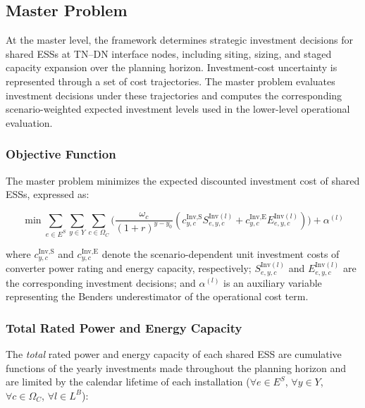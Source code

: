 \documentclass[preprint,12pt]{elsarticle}
\begin{document}
\subsection{Master Problem}

At the master level, the framework determines strategic investment decisions for shared ESSs at TN--DN interface nodes, including siting, sizing, and staged capacity expansion over the planning horizon. Investment-cost uncertainty is represented through a set of cost trajectories. The master problem evaluates investment decisions under these trajectories and computes the corresponding scenario-weighted expected investment levels used in the lower-level operational evaluation. %

\subsubsection{Objective Function}

The master problem minimizes the expected discounted investment cost of shared ESSs, expressed as:

\begin{equation}
    \min \sum_{e \in E^S} \sum_{y \in Y} \sum_{c \in \Omega_C} 
    \Bigg( 
        \frac{\omega_c}{(1 + r)^{y - y_0}} 
        \left( 
            c^{\text{Inv,S}}_{y,c} S^{\text{Inv}(l)}_{e,y,c} + 
            c^{\text{Inv,E}}_{y,c} E^{\text{Inv}(l)}_{e,y,c} 
        \right)
    \Bigg)
    + \alpha^{(l)}
\end{equation}

\noindent
where 
$c^{\text{Inv,S}}_{y,c}$ and $c^{\text{Inv,E}}_{y,c}$ denote the scenario-dependent unit investment costs of converter power rating and energy capacity, respectively; 
$S^{\text{Inv}(l)}_{e,y,c}$ and $E^{\text{Inv}(l)}_{e,y,c}$ are the corresponding investment decisions; and 
$\alpha^{(l)}$ is an auxiliary variable representing the Benders underestimator of the operational cost term.

\subsubsection{Total Rated Power and Energy Capacity}

The \textit{total} rated power and energy capacity of each shared ESS are cumulative functions of the yearly investments made throughout the planning horizon and are limited by the calendar lifetime of each installation ($\forall e \in E^S$, $\forall y \in Y$, $\forall c \in \Omega_C$, $\forall l \in L^B$):
\end{document}
